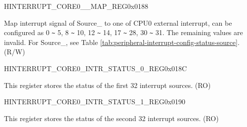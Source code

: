 \begin{register}{H}{INTERRUPT\_CORE0\_\_MAP\_REG}{0x{}0188}\label{regdesc:INTERRUPTCORE0DMAEXTMEMREJECTINTMAPREG}
%
%
\regnewline%
\begin{regdesc}\begin{reglist}
\item [INTERRUPT\_CORE0\_SOURCE\_\regindex{Y}\_MAP] Map interrupt signal of Source\_ to one of CPU0 external interrupt, can be configured as 0 \verb+~+ 5, 8 \verb+~+ 10, 12 \verb+~+ 14, 17 \verb+~+ 28, 30 \verb+~+ 31. The remaining values are invalid. For Source\_, see Table \ref{tab:peripheral-interrupt-config-status-source}. (R/W)
\end{reglist}\end{regdesc}
\end{register} \vspace{-3em}

\begin{register}{H}{INTERRUPT\_CORE0\_INTR\_STATUS\_0\_REG}{0x{}018C}\label{regdesc:INTERRUPTCORE0INTRSTATUS0REG}
%
\regnewline%
\begin{regdesc}\begin{reglist}
\label{fielddesc:INTERRUPTCORE0INTRSTATUS0}\item [INTERRUPT\_CORE0\_INTR\_STATUS\_0] This register stores the status of the first 32 interrupt sources. (RO)
\end{reglist}\end{regdesc}
\end{register}


\begin{register}{H}{INTERRUPT\_CORE0\_INTR\_STATUS\_1\_REG}{0x{}0190}\label{regdesc:INTERRUPTCORE0INTRSTATUS1REG}
%
\regnewline%
\begin{regdesc}\begin{reglist}
\label{fielddesc:INTERRUPTCORE0INTRSTATUS1}\item [INTERRUPT\_CORE0\_INTR\_STATUS\_1] This register stores the status of the second 32 interrupt sources. (RO)
\end{reglist}\end{regdesc}
\end{register}


